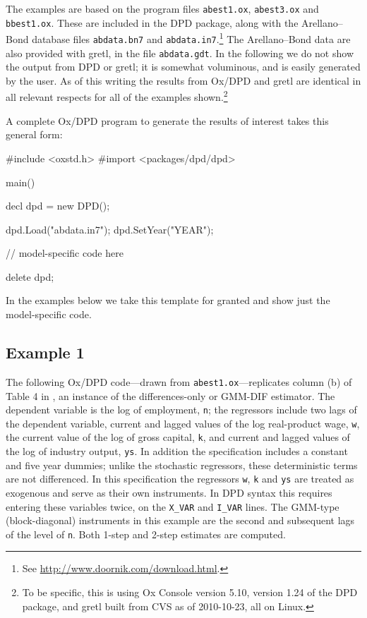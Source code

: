 The examples are based on the program files \texttt{abest1.ox},
\texttt{abest3.ox} and \texttt{bbest1.ox}. These are included in the
DPD package, along with the Arellano--Bond database files
\texttt{abdata.bn7} and \texttt{abdata.in7}.\footnote{See
  \url{http://www.doornik.com/download.html}.} The
Arellano--Bond data are also provided with gretl, in the file
\texttt{abdata.gdt}. In the following we do not show the output from
DPD or gretl; it is somewhat voluminous, and is easily generated by
the user. As of this writing the results from Ox/DPD and gretl are
identical in all relevant respects for all of the examples
shown.\footnote{To be specific, this is using Ox Console version 5.10,
  version 1.24 of the DPD package, and gretl built from CVS as of
  2010-10-23, all on Linux.}

A complete Ox/DPD program to generate the results of interest takes
this general form:

\begin{code}
#include <oxstd.h>
#import <packages/dpd/dpd>

main()
{
    decl dpd = new DPD();

    dpd.Load("abdata.in7");
    dpd.SetYear("YEAR");

    // model-specific code here

    delete dpd;
}
\end{code}
%
In the examples below we take this template for granted and show just
the model-specific code.

\subsection{Example 1}

The following Ox/DPD code---drawn from \texttt{abest1.ox}---replicates
column (b) of Table 4 in \cite{arellano-bond91}, an instance of the
differences-only or GMM-DIF estimator. The dependent variable is the
log of employment, \texttt{n}; the regressors include two lags of the
dependent variable, current and lagged values of the log real-product
wage, \texttt{w}, the current value of the log of gross capital,
\texttt{k}, and current and lagged values of the log of industry
output, \texttt{ys}. In addition the specification includes a constant
and five year dummies; unlike the stochastic regressors, these
deterministic terms are not differenced. In this specification the
regressors \texttt{w}, \texttt{k} and \texttt{ys} are treated as
exogenous and serve as their own instruments. In DPD syntax this
requires entering these variables twice, on the \verb|X_VAR| and
\verb|I_VAR| lines. The GMM-type (block-diagonal) instruments in this
example are the second and subsequent lags of the level of \texttt{n}.
Both 1-step and 2-step estimates are computed.

